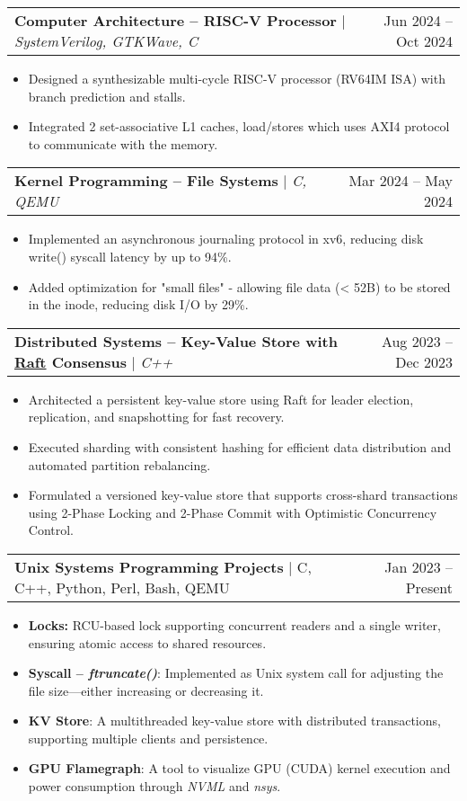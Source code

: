 \documentclass[letterpaper,11pt]{article}
\makeatletter
\newcommand{\resumeItem}[1]{
  \item\small{
    {#1 \vspace{-2pt}}
  }
}
\newcommand{\resumeProjectHeading}[2]{
    \item
    \begin{tabular*}{1.001\textwidth}{l@{\extracolsep{\fill}}r}
      \small#1 & \small #2\\
    \end{tabular*}\vspace{-7pt}
}
\newcommand{\resumeItemListStart}{\begin{itemize}}
\newcommand{\resumeItemListEnd}{\end{itemize}\vspace{-5pt}}
\makeatother
\begin{document}
\resumeProjectHeading
{\textbf{\normalsize{Computer Architecture -- RISC-V Processor}} $|$ \emph{SystemVerilog, GTKWave, C}}{Jun 2024 -- Oct 2024}
\resumeItemListStart
\resumeItem{Designed a synthesizable multi-cycle RISC-V processor (RV64IM ISA) with branch prediction and stalls.}
\resumeItem{Integrated 2 set-associative L1 caches, load/stores which uses AXI4 protocol to communicate with the memory.}
\resumeItemListEnd
\vspace{-17pt}

\resumeProjectHeading
{\textbf{\normalsize{Kernel Programming -- File Systems}} $|$ \emph{C, QEMU}}{Mar 2024 -- May 2024}
\resumeItemListStart
\resumeItem{
  Implemented an asynchronous journaling protocol in xv6, reducing disk write() syscall latency by up to 94\%.
}
\resumeItem{
  Added optimization for "small files" - allowing file data (\textless{} 52B) to be stored in the inode, reducing disk I/O by 29\%.
}

\resumeItemListEnd
\vspace{-17pt}

\resumeProjectHeading
{\textbf{\normalsize{Distributed Systems -- Key-Value Store with \href{https://raft.github.io/raft.pdf}{Raft} Consensus}} $|$ \emph{C++}}{Aug 2023 -- Dec 2023}
\resumeItemListStart
\resumeItem{Architected a persistent key-value store using Raft for leader election, replication, and snapshotting for fast recovery.}
\resumeItem{Executed sharding with consistent hashing for efficient data distribution and automated partition rebalancing.}
\resumeItem{Formulated a versioned key-value store that supports cross-shard transactions using 2-Phase Locking and 2-Phase Commit
  with Optimistic Concurrency Control.}
\resumeItemListEnd
\vspace{-17pt}

\resumeProjectHeading
{\textbf{\normalsize{Unix Systems Programming Projects}} $|$ C, C++, Python, Perl, Bash, QEMU}{Jan 2023 -- Present}
\resumeItemListStart
\resumeItem{\textbf{Locks:} RCU-based lock supporting concurrent readers and a single writer, ensuring atomic access to shared resources.}
\resumeItem{
  \textbf{Syscall -- \textit{ftruncate()}}: Implemented as Unix system call for adjusting the file size—either increasing or decreasing it.
}
\resumeItem{\textbf{KV Store}: A multithreaded key-value store with distributed transactions, supporting multiple clients and persistence.}
\resumeItem{\textbf{GPU Flamegraph}: A tool to visualize GPU (CUDA) kernel execution and power consumption through \textit{NVML} and \textit{nsys}.}
\resumeItemListEnd
\vspace{-17pt}
\end{document}
